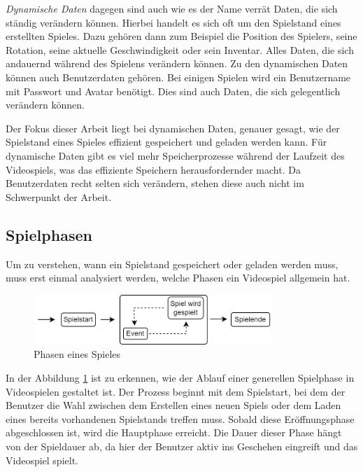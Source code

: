 \textit{Dynamische Daten} dagegen sind auch wie es der Name verrät Daten, die sich ständig verändern können. Hierbei handelt es sich oft um den Spielstand eines erstellten Spieles. Dazu gehören dann zum Beispiel die Position des Spielers, seine Rotation, seine aktuelle Geschwindigkeit oder sein Inventar. Alles Daten, die sich andauernd während des Spielens verändern können. Zu den dynamischen Daten können auch Benutzerdaten gehören. Bei einigen Spielen wird ein Benutzername mit Passwort und Avatar benötigt. Dies sind auch Daten, die sich gelegentlich verändern können.

Der Fokus dieser Arbeit liegt bei dynamischen Daten, genauer gesagt, wie der Spielstand eines Spieles effizient gespeichert und geladen werden kann. Für dynamische Daten gibt es viel mehr Speicherprozesse während der Laufzeit des Videospiels, was das effiziente Speichern herausfordernder macht. Da Benutzerdaten recht selten sich verändern, stehen diese auch nicht im Schwerpunkt der Arbeit.  


\subsection{Spielphasen} \label{ssect:spielphasen}
Um zu verstehen, wann ein Spielstand gespeichert oder geladen werden muss, muss erst einmal analysiert werden, welche Phasen ein Videospiel allgemein hat.

\begin{figure}[htp]
    \centering
    \includegraphics[width=0.8\textwidth]{images/Spielphasen.png}
    \caption{Phasen eines Spieles}
    \label{fig:spielphasen}
\end{figure}

In der Abbildung \ref{fig:spielphasen} ist zu erkennen, wie der Ablauf einer generellen Spielphase in Videospielen gestaltet ist. Der Prozess beginnt mit dem Spielstart, bei dem der Benutzer die Wahl zwischen dem Erstellen eines neuen Spiels oder dem Laden eines bereits vorhandenen Spielstands treffen muss. Sobald diese Eröffnungsphase abgeschlossen ist, wird die Hauptphase erreicht. Die Dauer dieser Phase hängt von der Spieldauer ab, da hier der Benutzer aktiv ins Geschehen eingreift und das Videospiel spielt.

